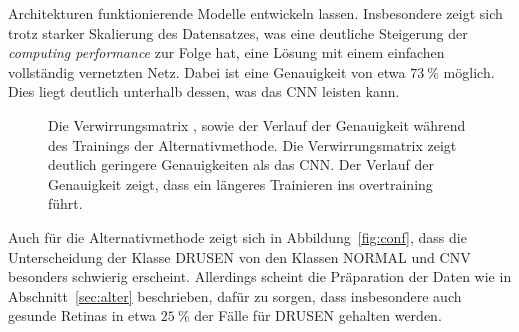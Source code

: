Architekturen funktionierende Modelle entwickeln lassen. Insbesondere zeigt
sich trotz starker Skalierung des Datensatzes, was eine deutliche Steigerung
der \textit{computing performance} zur Folge hat, eine Lösung mit einem
einfachen vollständig vernetzten Netz. Dabei ist eine Genauigkeit von etwa
$\SI{73}{\percent}$ möglich. Dies liegt deutlich unterhalb dessen, was das CNN
leisten kann.
%
\begin{figure}[h!]
  \caption{Die Verwirrungsmatrix \protect{}, sowie der Verlauf der Genauigkeit \protect{} während des Trainings der Alternativmethode. Die Verwirrungsmatrix zeigt deutlich geringere Genauigkeiten als das CNN. Der Verlauf der Genauigkeit zeigt, dass ein längeres Trainieren ins overtraining führt.}
  \label{fig:erg}
\end{figure}
%
Auch für die Alternativmethode zeigt sich in Abbildung~\ref{fig:conf}, dass die
Unterscheidung der Klasse DRUSEN von den Klassen NORMAL und CNV besonders
schwierig erscheint. Allerdings scheint die Präparation der Daten wie in
Abschnitt~\ref{sec:alter} beschrieben, dafür zu sorgen, dass insbesondere auch
gesunde Retinas in etwa $\SI{25}{\percent}$ der Fälle für DRUSEN gehalten
werden.

